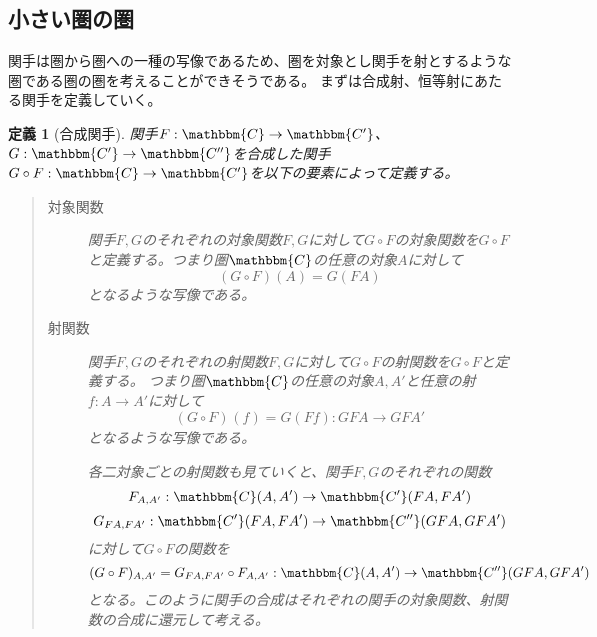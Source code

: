 \documentclass[dvipdfmx]{jsarticle}
\newcommand{\cat}[1]{\mathbbm{#1}}
\newcommand{\arrow}{\rightarrow}
\newcommand{\functor}[3]{#1:\cat{#2}\arrow \cat{#3}}
\newcommand{\mor}[3]{#1:#2\arrow #3}
\newcommand{\arset}[3]{\cat{#1}(#2,#3)}
\newtheorem{define}{定義}[section]
\numberwithin{proof}{subsection}
\numberwithin{prop}{subsection}
\numberwithin{define}{subsection}
\begin{document}
	\subsection{小さい圏の圏}
	関手は圏から圏への一種の写像であるため、圏を対象とし関手を射とするような圏である圏の圏を考えることができそうである。
	まずは合成射、恒等射にあたる関手を定義していく。
	\begin{define}[合成関手]
		関手$\functor{F}{C}{C'}$、$\functor{G}{C'}{C''}$を合成した関手$\functor{G\circ F}{C}{C'}$を以下の要素によって定義する。
		\begin{quote}
			\begin{description}
			\item[対象関数]関手$F,G$のそれぞれの対象関数$F,G$に対して$G\circ F$の対象関数を$G\circ F$と定義する。つまり圏$\cat{C}$の任意の対象$A$に対して\[(G\circ F)(A)=G(FA)\]となるような写像である。
			\item[射関数]関手$F,G$のそれぞれの射関数$F,G$に対して$G\circ F$の射関数を$G\circ F$と定義する。
			つまり圏$\cat{C}$の任意の対象$A,A'$と任意の射$\mor{f}{A}{A'}$に対して\[\mor{(G\circ F)_{}(f)=G(Ff)}{GFA}{GF{A'}}\]となるような写像である。

			各二対象ごとの射関数も見ていくと、関手$F,G$のそれぞれの関数\[\mor{F_{A,A'}}{\arset{C}{A}{A'}}{\arset{C'}{FA}{FA'}}\]\[\mor{G_{FA,FA'}}{\arset{C'}{FA}{FA'}}{\arset{C''}{GFA}{GFA'}}\]に対して$G\circ F$の関数を\[(G\circ F)_{A,A'}=\mor{G_{FA,FA'}\circ F_{A,A'}}{\arset{C}{A}{A'}}{\arset{C''}{GFA}{GFA'}}\]となる。このように関手の合成はそれぞれの関手の対象関数、射関数の合成に還元して考える。

			\begin{center}
\end{center}
\end{description}
\end{quote}
\end{define}
\end{document}

